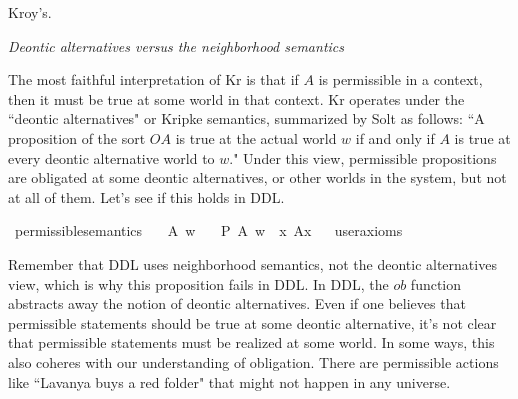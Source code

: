 \begin{isabellebody}
\begin{isamarkuptext}
Kroy's.%
\end{isamarkuptext}\isamarkuptrue%
%
\emph{Deontic alternatives versus the neighborhood semantics}
%
\begin{isamarkuptext}%
The most faithful interpretation of Kr is that if $A$ is permissible in a context, then 
it must be true at some world in that context. Kr operates under the ``deontic alternatives" or Kripke semantics, 
summarized by Solt \cite{solt} as follows: ``A proposition of the sort $O A$ is true at the actual world $w$ if and
only if $A$ is true at every deontic alternative world to $w$." Under this view, permissible propositions
are obligated at some deontic alternatives, or other worlds in the system, but not at all of them. Let's 
see if this holds in DDL.%
\end{isamarkuptext}\isamarkuptrue%
\isamarkupfalse%
\ permissible{\isacharunderscore}semantics{\isacharcolon}\isanewline
\ \ \ A\ w\isanewline
\ \ \ {\isachardoublequoteopen}{\isacharparenleft}P\ {\isacharbraceleft}A{\isacharbraceright}{\isacharparenright}\ w\ {\isasymlongrightarrow}\ {\isacharparenleft}{\isasymexists}x{\isachardot}\ A{\isacharparenleft}x{\isacharparenright}{\isacharparenright}{\isachardoublequoteclose}\isanewline
\ \ \isamarkupfalse%
{\isacharbrackleft}user{\isacharunderscore}axioms{\isacharbrackright}%
\isadelimproof
\ %
\endisadelimproof
%
\isatagproof
{}\isamarkupfalse%
\isanewline
%
%
\endisatagproof
{\isafoldproof}%
%
\isadelimproof
%
\endisadelimproof
%
\begin{isamarkuptext}%
Remember that DDL uses neighborhood semantics, not the deontic alternatives view, which is why this
 proposition fails in DDL. In DDL, the $ob$ function abstracts away the notion of
 deontic alternatives. Even if one believes that permissible 
statements should be true at some deontic alternative, it's not clear that permissible statements
 must be realized at some world. In some ways, this also coheres with our understanding of obligation. There 
are permissible actions like ``Lavanya buys a red folder" that might not happen in any universe.


\end{isamarkuptext}
\end{isabellebody}

